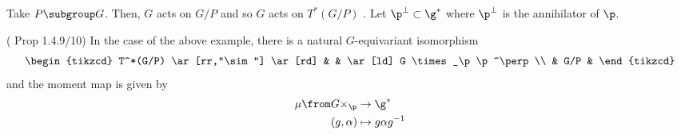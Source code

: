 \begin{example}
  Take \(P \subgroup G\). Then, \(G\) acts on \(G/P\) and so \(G\)
  acts on \(T^*(G/P)\) . Let \(\p^\perp \subset \g^*\)
  where \(\p^\perp\) is the annihilator of \(\p\).
\end{example}
\begin{prop}
  (\cite{cg} Prop 1.4.9/10) In the case of the above example, there is a natural
  \(G\)-equivariant isomorphism  \[
    \begin{tikzcd}
      T^*(G/P) \ar[rr,"\sim"] \ar[rd] & & \ar[ld] G \times_\p \p^\perp \\
      & G/P &
    \end{tikzcd}
  \]
  and the moment map is given by
  \begin{align*}
    \mu \from & G \times_\p \to \g^* \\
    & (g,\alpha) \mapsto g \alpha g^{-1}
  \end{align*} 
\end{prop}
